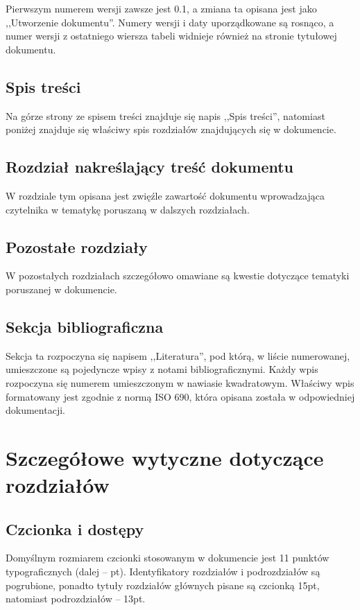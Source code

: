 \documentclass [11pt, a4paper, leqno]	{article}	%
\begin{document}
Pierwszym numerem wersji zawsze jest 0.1, a zmiana ta opisana jest jako ,,Utworzenie dokumentu''. Numery wersji i daty uporządkowane są rosnąco, a numer wersji z ostatniego wiersza tabeli widnieje również na stronie tytułowej dokumentu.

\subsection{Spis treści}
\noindent
Na górze strony ze spisem treści znajduje się napis ,,Spis treści'', natomiast poniżej znajduje się właściwy spis rozdziałów znajdujących się w dokumencie. 

\subsection{Rozdział nakreślający treść dokumentu}
\noindent
W rozdziale tym opisana jest zwięźle zawartość dokumentu wprowadzająca czytelnika w tematykę poruszaną w dalszych rozdziałach.

\subsection{Pozostałe rozdziały}
\noindent
W pozostałych rozdziałach szczegółowo omawiane są kwestie dotyczące tematyki poruszanej w dokumencie.

\subsection{Sekcja bibliograficzna}
\noindent
Sekcja ta rozpoczyna się napisem ,,Literatura'', pod którą, w liście numerowanej, umieszczone są pojedyncze wpisy z notami bibliograficznymi.
Każdy wpis rozpoczyna się numerem umieszczonym w nawiasie kwadratowym. Właściwy wpis formatowany jest zgodnie z normą ISO 690, która opisana została w odpowiedniej dokumentacji. 

\section{Szczegółowe wytyczne dotyczące rozdziałów}

\subsection{Czcionka i dostępy}
\noindent
Domyślnym rozmiarem czcionki stosowanym w dokumencie jest 11 punktów typograficznych (dalej -- pt). Identyfikatory rozdziałów i podrozdziałów są pogrubione, ponadto tytuły rozdziałów głównych pisane są czcionką 15pt, natomiast podrozdziałów -- 13pt.
\end{document}
